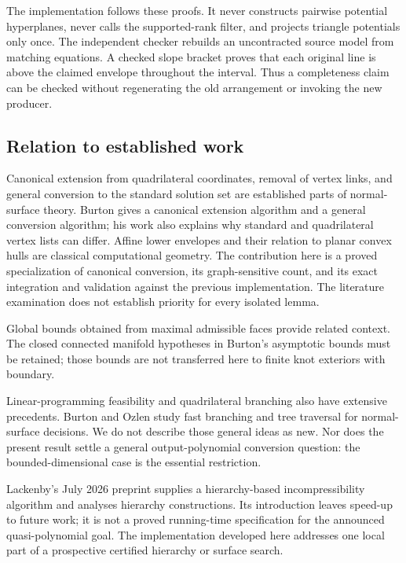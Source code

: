 \documentclass[11pt]{article}
\theoremstyle{definition}
\theoremstyle{remark}
\begin{document}
The implementation follows these proofs. It never constructs pairwise
potential hyperplanes, never calls the supported-rank filter, and projects
triangle potentials only once. The independent checker rebuilds an
uncontracted source model from matching equations. A checked slope bracket
proves that each original line is above the claimed envelope throughout the
interval. Thus a completeness claim can be checked without regenerating the
old arrangement or invoking the new producer.

\subsection{Relation to established work}

Canonical extension from quadrilateral coordinates, removal of vertex links,
and general conversion to the standard solution set are established parts of
normal-surface theory. Burton gives a canonical extension algorithm and a
general conversion algorithm; his work also explains why standard and
quadrilateral vertex lists can differ.\cite{burtonconversion} Affine lower
envelopes and their relation to planar convex hulls are classical computational
geometry.\cite{cgalenvelopes} The contribution here is a proved specialization
of canonical conversion, its graph-sensitive count, and its exact integration
and validation against the previous implementation. The literature examination
does not establish priority for every isolated lemma.

Global bounds obtained from maximal admissible faces provide related context.
The closed connected manifold hypotheses in Burton's asymptotic bounds must
be retained; those bounds are not transferred here to finite knot exteriors
with boundary.\cite{burtonfaces}

Linear-programming feasibility and quadrilateral branching also have extensive
precedents. Burton and Ozlen study fast branching and tree traversal for
normal-surface decisions.\cite{burtonozlen,treetraversal} We do not describe
those general ideas as new. Nor does the present result settle a general
output-polynomial conversion question: the bounded-dimensional case is the
essential restriction.

Lackenby's July 2026 preprint supplies a hierarchy-based incompressibility
algorithm and analyses hierarchy constructions. Its introduction leaves
speed-up to future work; it is not a proved running-time specification for the
announced quasi-polynomial goal.\cite{lackenby2026} The implementation developed
here addresses one local part of a prospective certified hierarchy or surface
search.
\end{document}
